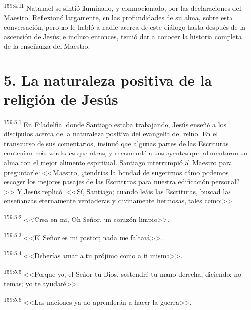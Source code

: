\par 
\textsuperscript{159:4.11} Natanael se sintió iluminado, y conmocionado, por las declaraciones del Maestro. Reflexionó largamente, en las profundidades de su alma, sobre esta conversación, pero no le habló a nadie acerca de este diálogo hasta después de la ascensión de Jesús; e incluso entonces, temió dar a conocer la historia completa de la enseñanza del Maestro.

\section*{5. La naturaleza positiva de la religión de Jesús}
\par 
\textsuperscript{159:5.1} En Filadelfia, donde Santiago estaba trabajando, Jesús enseñó a los discípulos acerca de la naturaleza positiva del evangelio del reino. En el transcurso de sus comentarios, insinuó que algunas partes de las Escrituras contenían más verdades que otras, y recomendó a sus oyentes que alimentaran su alma con el mejor alimento espiritual. Santiago interrumpió al Maestro para preguntarle: <<Maestro, ¿tendrías la bondad de sugerirnos cómo podemos escoger los mejores pasajes de las Escrituras para nuestra edificación personal?>> Y Jesús replicó: <<Sí, Santiago; cuando leáis las Escrituras, buscad las enseñanzas eternamente verdaderas y divinamente hermosas, tales como:>>

\par 
\textsuperscript{159:5.2} <<Crea en mi, Oh Señor, un corazón limpio>>.

\par 
\textsuperscript{159:5.3} <<El Señor es mi pastor; nada me faltará>>.

\par 
\textsuperscript{159:5.4} <<Deberías amar a tu prójimo como a ti mismo>>.

\par 
\textsuperscript{159:5.5} <<Porque yo, el Señor tu Dios, sostendré tu mano derecha, diciendo: no temas; yo te ayudaré>>.

\par 
\textsuperscript{159:5.6} <<Las naciones ya no aprenderán a hacer la guerra>>.

